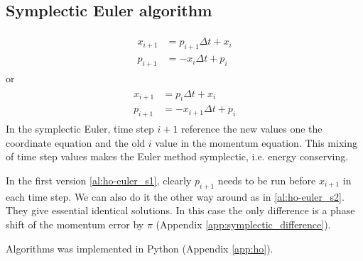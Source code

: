 \subsection{Symplectic Euler algorithm}
\begin{align}
\begin{split}
\label{al:ho-euler_s1}
x_{i+1} &= p_{i+1}\Delta t + x_i  \\
p_{i+1} &= -x_i\Delta t + p_i
\end{split}
\end{align}
or
\begin{align}
\begin{split}
\label{al:ho-euler_s2}
x_{i+1} &= p_{i}\Delta t + x_i  \\
p_{i+1} &= -x_{i+1}\Delta t + p_i
\end{split}
\end{align}
In the symplectic Euler, time step $i+1$ reference the new values one the coordinate equation and the old $i$ value in the momentum equation. This mixing of time step values makes the Euler method symplectic, i.e. energy conserving.

In the first version \eqref{al:ho-euler_s1}, clearly $p_{i+1}$ needs to be run before $x_{i+1}$ in each time step. We can also do it the other way around as in \eqref{al:ho-euler_s2}. They give essential identical solutions. In this case the only difference is a phase shift of the momentum error by $\pi$ (Appendix \ref{app:symplectic_difference}).

Algorithms  was implemented in Python (Appendix \ref{app:ho}).

